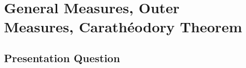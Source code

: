 \documentclass[class=book, crop=false]{standalone}
\begin{document}
    \section{General Measures, Outer Measures, Carath\'{e}odory Theorem}
        \subsection{Presentation Question}
\end{document}
